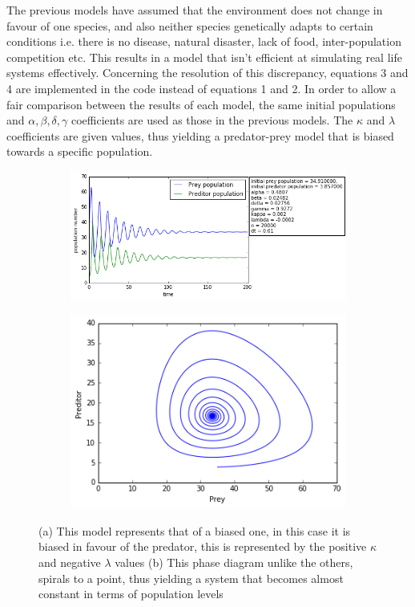 \documentclass[11pt]{elsarticle}
\begin{document}
The previous models have assumed that the environment does not change in favour of one species, and also neither species genetically adapts to certain conditions i.e. there is no disease, natural disaster, lack of food, inter-population competition etc. This results in a model that isn't efficient at simulating real life systems effectively. Concerning the resolution of this discrepancy, equations 3 and 4 are implemented in the code instead of equations 1 and 2. In order to allow a fair comparison between the results of each model, the same initial populations and $\alpha,\beta,\delta,\gamma$  coefficients are used as those in the previous models. The $\kappa$ and $\lambda$ coefficients are given values, thus yielding a predator-prey model that is biased towards a specific population.

\begin{figure}
\centering
   \begin{subfigure}[b]{1\textwidth}
   \includegraphics[width=0.9\linewidth]{figure3_time.png}
   \caption{}
   \label{fig:Ng1} 
\end{subfigure}

\begin{subfigure}[b]{1\textwidth}
   \includegraphics[width=0.60\linewidth]{figure3_phase.png}
   \caption{}
   \label{fig:Ng2}
\end{subfigure}

\caption{(a) This model represents that of a biased one, in this case it is biased in favour of the predator, this is represented by the positive $\kappa$ and negative $\lambda$ values (b) This phase diagram unlike the others, spirals to a point, thus yielding a system that becomes almost constant in terms of population levels  }
\end{figure}
\end{document}
